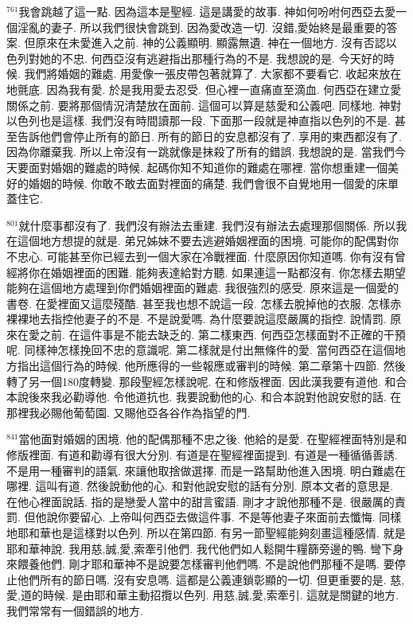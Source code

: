 \documentclass{book}
\begin{document}
$^{761}$我會跳越了這一點.
因為這本是聖經.
這是講愛的故事.
神如何吩咐何西亞去愛一個淫亂的妻子.
所以我們很快會跳到.
因為愛改造一切.
沒錯,愛始終是最重要的答案.
但原來在未愛進入之前.
神的公義顯明.
顯露無遺.
神在一個地方.
沒有否認以色列對她的不忠.
何西亞沒有逃避指出那種行為的不是.
我想說的是.
今天好的時候.
我們將婚姻的難處.
用愛像一張皮帶包著就算了.
大家都不要看它.
收起來放在地氈底.
因為我有愛.
於是我用愛去忍受.
但心裡一直痛直至滴血.
何西亞在建立愛關係之前.
要將那個情況清楚放在面前.
這個可以算是慈愛和公義吧.
同樣地.
神對以色列也是這樣.
我們沒有時間讀那一段.
下面那一段就是神直指以色列的不是.
甚至告訴他們會停止所有的節日.
所有的節日的安息都沒有了.
享用的東西都沒有了.
因為你離棄我.
所以上帝沒有一跳就像是抹殺了所有的錯誤.
我想說的是.
當我們今天要面對婚姻的難處的時候.
起碼你知不知道你的難處在哪裡.
當你想重建一個美好的婚姻的時候.
你敢不敢去面對裡面的痛楚.
我們會很不自覺地用一個愛的床單蓋住它.

$^{801}$就什麼事都沒有了.
我們沒有辦法去重建.
我們沒有辦法去處理那個關係.
所以我在這個地方想提的就是.
弟兄姊妹不要去逃避婚姻裡面的困境.
可能你的配偶對你不忠心.
可能甚至你已經去到一個大家在冷戰裡面.
什麼原因你知道嗎.
你有沒有曾經將你在婚姻裡面的困難.
能夠表達給對方聽.
如果連這一點都沒有.
你怎樣去期望能夠在這個地方處理到你們婚姻裡面的難處.
我很強烈的感受.
原來這是一個愛的書卷.
在愛裡面又這麼殘酷.
甚至我也想不說這一段.
怎樣去脫掉他的衣服.
怎樣赤裸裸地去指控他妻子的不是.
不是說愛嗎.
為什麼要說這麼嚴厲的指控.
說情罰.
原來在愛之前.
在這件事是不能去缺乏的.
第二樣東西.
何西亞怎樣面對不正確的干預呢.
同樣神怎樣挽回不忠的意識呢.
第二樣就是付出無條件的愛.
當何西亞在這個地方指出這個行為的時候.
他所應得的一些報應或審判的時候.
第二章第十四節.
然後轉了另一個180度轉變.
那段聖經怎樣說呢.
在和修版裡面.
因此漢我要有道他.
和合本說後來我必勸導他.
令他道抗也.
我要說動他的心.
和合本說對他說安慰的話.
在那裡我必賜他葡萄園.
又賜他亞各谷作為指望的門.

$^{841}$當他面對婚姻的困境.
他的配偶那種不忠之後.
他給的是愛.
在聖經裡面特別是和修版裡面.
有道和勸導有很大分別.
有道是在聖經裡面提到.
有道是一種循循善誘.
不是用一種審判的語氣.
來讓他取捨做選擇.
而是一路幫助他進入困境.
明白難處在哪裡.
這叫有道.
然後說動他的心.
和對他說安慰的話有分別.
原本文者的意思是.
在他心裡面說話.
指的是戀愛人當中的甜言蜜語.
剛才才說他那種不是.
很嚴厲的責罰.
但他說你要留心.
上帝叫何西亞去做這件事.
不是等他妻子來面前去懺悔.
同樣地耶和華也是這樣對以色列.
所以在第四節.
有另一節聖經能夠刻畫這種感情.
就是耶和華神說.
我用慈,誠,愛,索牽引他們.
我代他們如人鬆開牛糧篩旁邊的鴨.
彎下身來餵養他們.
剛才耶和華神不是說要怎樣審判他們嗎.
不是說他們那種不是嗎.
要停止他們所有的節日嗎.
沒有安息嗎.
這都是公義連鎖彰顯的一切.
但更重要的是.
慈,愛,道的時候.
是由耶和華主動招攬以色列.
用慈,誠,愛,索牽引.
這就是關鍵的地方.
我們常常有一個錯誤的地方.
\end{document}
